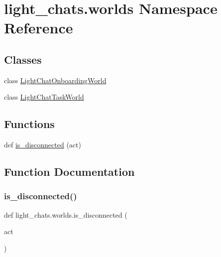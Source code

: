 \hypertarget{namespacelight__chats_1_1worlds}{}\section{light\+\_\+chats.\+worlds Namespace Reference}
\label{namespacelight__chats_1_1worlds}
\subsection*{Classes}
\begin{DoxyCompactItemize}
\item 
class \hyperlink{classlight__chats_1_1worlds_1_1LightChatOnboardingWorld}{Light\+Chat\+Onboarding\+World}
\item 
class \hyperlink{classlight__chats_1_1worlds_1_1LightChatTaskWorld}{Light\+Chat\+Task\+World}
\end{DoxyCompactItemize}
\subsection*{Functions}
\begin{DoxyCompactItemize}
\item 
def \hyperlink{namespacelight__chats_1_1worlds_a43b0aff73307cda95a089763b77f40d3}{is\+\_\+disconnected} (act)
\end{DoxyCompactItemize}


\subsection{Function Documentation}
\mbox{\label{namespacelight__chats_1_1worlds_a43b0aff73307cda95a089763b77f40d3}} 
\subsubsection{\texorpdfstring{is\+\_\+disconnected()}{is\_disconnected()}}
{\footnotesize\ttfamily def light\+\_\+chats.\+worlds.\+is\+\_\+disconnected (\begin{DoxyParamCaption}\item[{}]{act }\end{DoxyParamCaption})}



